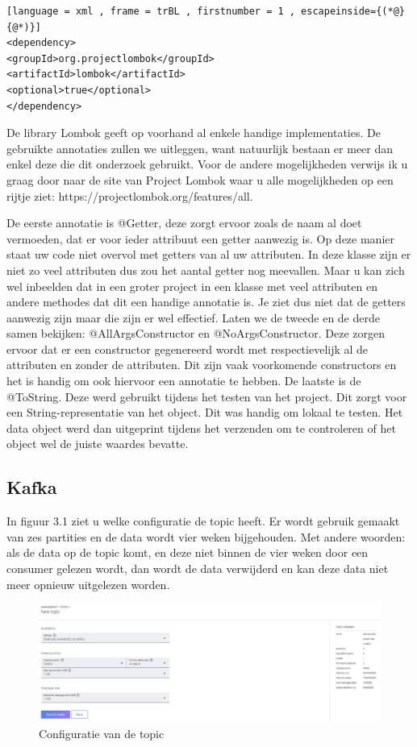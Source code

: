 \begin{lstlisting}[language = xml , frame = trBL , firstnumber = 1 , escapeinside={(*@}{@*)}]
<dependency>
<groupId>org.projectlombok</groupId>
<artifactId>lombok</artifactId>
<optional>true</optional>
</dependency>
\end{lstlisting}

De library Lombok geeft op voorhand al enkele handige implementaties. De gebruikte annotaties zullen we uitleggen, want natuurlijk bestaan er meer dan enkel deze die dit onderzoek gebruikt. Voor de andere mogelijkheden verwijs ik u graag door naar de site van Project Lombok waar u alle mogelijkheden op een rijtje ziet: https://projectlombok.org/features/all. 

De eerste annotatie is @Getter, deze zorgt ervoor zoals de naam al doet vermoeden, dat er voor ieder attribuut een getter aanwezig is. Op deze manier staat uw code niet overvol met getters van al uw attributen. In deze klasse zijn er niet zo veel attributen dus zou het aantal getter nog meevallen. Maar u kan zich wel inbeelden dat in een groter project in een klasse met veel attributen en andere methodes dat dit een handige annotatie is. Je ziet dus niet dat de getters aanwezig zijn maar die zijn er wel effectief. Laten we de tweede en de derde samen bekijken: @AllArgsConstructor en @NoArgsConstructor. Deze zorgen ervoor dat er een constructor gegenereerd wordt met respectievelijk al de attributen en zonder de attributen. Dit zijn vaak voorkomende constructors en het is handig om ook hiervoor een annotatie te hebben. De laatste  is de @ToString. Deze werd gebruikt tijdens het testen van het project. Dit zorgt voor een String-representatie van het object. Dit was handig om lokaal te testen. Het data object werd dan uitgeprint tijdens het verzenden om te controleren of het object wel de juiste waardes bevatte.
\subsection{Kafka}
In figuur 3.1 ziet u welke configuratie de topic heeft. Er wordt gebruik gemaakt van zes partities en de data wordt vier weken bijgehouden. Met andere woorden: als de data op de topic komt, en deze niet binnen de vier weken door een consumer gelezen wordt, dan wordt de data verwijderd en kan deze data niet meer opnieuw uitgelezen worden.
\begin{figure}[h!]
    \centering
    \includegraphics[width=140mm]{../kafkaConfig.png}
    \caption{Configuratie van de topic}
    
\end{figure}
